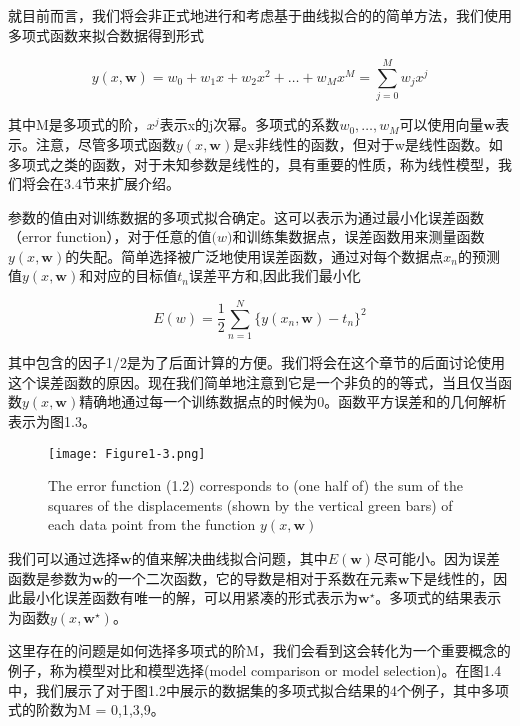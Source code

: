 	就目前而言，我们将会非正式地进行和考虑基于曲线拟合的的简单方法，我们使用多项式函数来拟合数据得到形式
	
	\begin{equation}
	y(x,\mathbf{w}) = w_0 + w_1x + w_2x^2 + \dots + w_Mx^M = \sum_{j = 0}^{M}w_jx^j
	\end{equation}
	
	其中M是多项式的阶，$x^j$表示x的j次幂。多项式的系数$w_0, \dots ,w_M$可以使用向量$\mathbf{w}$表示。注意，尽管多项式函数$y(x,\mathbf{w})$是x非线性的函数，但对于w是线性函数。如多项式之类的函数，对于未知参数是线性的，具有重要的性质，称为线性模型，我们将会在3.4节来扩展介绍。
	
	参数的值由对训练数据的多项式拟合确定。这可以表示为通过最小化误差函数（error function），对于任意的值$\mathbf(w)$和训练集数据点，误差函数用来测量函数$y(x,\mathbf{w})$的失配。简单选择被广泛地使用误差函数，通过对每个数据点$x_n$的预测值$y(x,\mathbf{w})$和对应的目标值$t_n$误差平方和,因此我们最小化
	
	\begin{equation}
	E(w) = \frac{1}{2} \sum_{n = 1}^{N}\{ y(x_n,\mathbf{w}) - t_n\}^2
	\end{equation}
	
	其中包含的因子1/2是为了后面计算的方便。我们将会在这个章节的后面讨论使用这个误差函数的原因。现在我们简单地注意到它是一个非负的的等式，当且仅当函数$y(x,\mathbf{w})$精确地通过每一个训练数据点的时候为0。函数平方误差和的几何解析表示为图1.3。
	
	
\begin{figure}
	\parbox{.4\textwidth}{\caption{The error function (1.2) corresponds to (one half of) the sum of the squares of the displacements (shown by the vertical green bars) of each data point from the function $y(x,\mathbf{w})$ } }
	\parbox{.5\textwidth}{\texttt{[image: Figure1-3.png]}}
	\label{fig:endb-flow} 
\end{figure}

	我们可以通过选择$\mathbf{w}$的值来解决曲线拟合问题，其中$E(\mathbf{w})$尽可能小。因为误差函数是参数为$\mathbf{w}$的一个二次函数，它的导数是相对于系数在元素$\mathbf{w}$下是线性的，因此最小化误差函数有唯一的解，可以用紧凑的形式表示为$\mathbf{w}^{\star}$。多项式的结果表示为函数$y(x,\mathbf{w}^{\star})$。
	
	这里存在的问题是如何选择多项式的阶M，我们会看到这会转化为一个重要概念的例子，称为模型对比和模型选择(model comparison or model selection)。在图1.4中，我们展示了对于图1.2中展示的数据集的多项式拟合结果的4个例子，其中多项式的阶数为M = 0,1,3,9。

